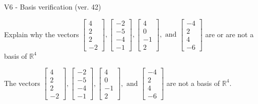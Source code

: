 \begin{exercise}
  \begin{exerciseTitle}V6 - Basis verification (ver. 42)\end{exerciseTitle}
  \begin{exerciseStatement}
    Explain why the vectors \(\left[\begin{array}{r}
4 \\
2 \\
2 \\
-2
\end{array}\right] , \left[\begin{array}{r}
-2 \\
-5 \\
-4 \\
-1
\end{array}\right] , \left[\begin{array}{r}
4 \\
0 \\
-1 \\
2
\end{array}\right] , \text{ and } \left[\begin{array}{r}
-4 \\
2 \\
4 \\
-6
\end{array}\right]\) are or are not a basis of \(\mathbb{R}^4\)	


  \end{exerciseStatement}
  \begin{exerciseAnswer}
   The vectors \(\left[\begin{array}{r}
4 \\
2 \\
2 \\
-2
\end{array}\right] , \left[\begin{array}{r}
-2 \\
-5 \\
-4 \\
-1
\end{array}\right] , \left[\begin{array}{r}
4 \\
0 \\
-1 \\
2
\end{array}\right] , \text{ and } \left[\begin{array}{r}
-4 \\
2 \\
4 \\
-6
\end{array}\right]\) 
  	 are not  a basis of \(\mathbb{R}^4\).
  


  \end{exerciseAnswer}
\end{exercise}